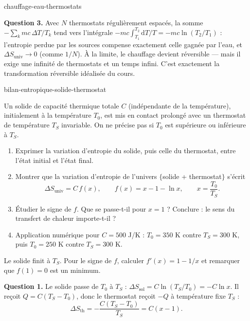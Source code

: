 \begin{exo}{chauffage-eau-thermostats}
\begin{solution}
\textbf{Question 3.} Avec $N$ thermostats régulièrement espacés, la somme $-\sum_k mc\,\Delta T/T_k$ tend vers l'intégrale $-mc\int_{T_1}^{T_2}\mathrm{d}T/T = -mc\ln(T_2/T_1)$ : l'entropie perdue par les sources compense exactement celle gagnée par l'eau, et $\Delta S_{\text{univ}} \to 0$ (comme $1/N$). À la limite, le chauffage devient réversible — mais il exige une infinité de thermostats et un temps infini. C'est exactement la transformation réversible idéalisée du cours.
\end{solution}
\end{exo}

\begin{exo}{bilan-entropique-solide-thermostat}

Un solide de capacité thermique totale $C$ (indépendante de la température), initialement à la température $T_0$, est mis en contact prolongé avec un thermostat de température $T_S$ invariable. On ne précise pas si $T_0$ est supérieure ou inférieure à $T_S$.

\begin{enumerate}
\item Exprimer la variation d'entropie du solide, puis celle du thermostat, entre l'état initial et l'état final.
\item Montrer que la variation d'entropie de l'univers $\{$solide + thermostat$\}$ s'écrit
\[
\Delta S_{\text{univ}} = C\,f(x), \qquad f(x) = x - 1 - \ln x, \qquad x = \frac{T_0}{T_S}.
\]
\item Étudier le signe de $f$. Que se passe-t-il pour $x = 1$ ? Conclure : le sens du transfert de chaleur importe-t-il ?
\item Application numérique pour $C = 500$ J/K : $T_0 = 350$ K contre $T_S = 300$ K, puis $T_0 = 250$ K contre $T_S = 300$ K.
\end{enumerate}

\begin{indication}
Le solide finit à $T_S$. Pour le signe de $f$, calculer $f'(x) = 1 - 1/x$ et remarquer que $f(1) = 0$ est un minimum.
\end{indication}

\begin{solution}
\textbf{Question 1.} Le solide passe de $T_0$ à $T_S$ : $\Delta S_{\text{sol}} = C\ln(T_S/T_0) = -C\ln x$. Il reçoit $Q = C(T_S - T_0)$, donc le thermostat reçoit $-Q$ à température fixe $T_S$ :
\[
\Delta S_{\text{th}} = -\frac{C(T_S - T_0)}{T_S} = C(x - 1).
\]


\end{solution}
\end{exo}
